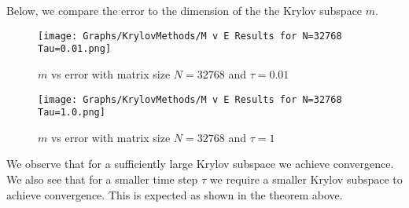 Below, we compare the error to the dimension of the the Krylov subspace $m$.
\begin{figure}[H]
    \centering
    \begin{minipage}{0.49\textwidth}
        \texttt{[image: Graphs/KrylovMethods/M v E Results for N=32768 Tau=0.01.png]} %
        \caption{$m$ vs error with matrix size $N=32768$ and $\tau = 0.01$}
        \label{fig:mEKrylov1}
    \end{minipage}\hfill
    \centering
    \begin{minipage}{0.49\textwidth}
        \texttt{[image: Graphs/KrylovMethods/M v E Results for N=32768 Tau=1.0.png]} %
        \caption{$m$ vs error with matrix size $N=32768$ and $\tau = 1$}
        \label{fig:mEKrylov2}
    \end{minipage}\hfill
\end{figure}
We observe that for a sufficiently large Krylov subspace we achieve convergence.
We also see that for a smaller time step $\tau$ we require a smaller Krylov subspace to achieve convergence.
This is expected as shown in the theorem above.

